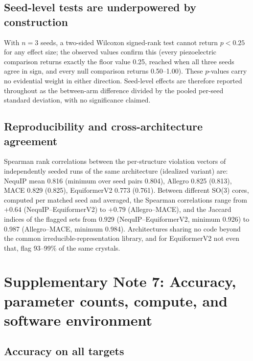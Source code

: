 \subsection*{Seed-level tests are underpowered by construction}

With $n = 3$ seeds, a two-sided Wilcoxon signed-rank test cannot return $p < 0.25$ for any effect size; the observed values confirm this (every piezoelectric comparison returns exactly the floor value 0.25, reached when all three seeds agree in sign, and every null comparison returns 0.50--1.00). These $p$-values carry no evidential weight in either direction. Seed-level effects are therefore reported throughout as the between-arm difference divided by the pooled per-seed standard deviation, with no significance claimed.

\subsection*{Reproducibility and cross-architecture agreement}

Spearman rank correlations between the per-structure violation vectors of independently seeded runs of the same architecture (idealized variant) are: NequIP mean 0.816 (minimum over seed pairs 0.804), Allegro 0.825 (0.813), MACE 0.829 (0.825), EquiformerV2 0.773 (0.761). Between different SO(3) cores, computed per matched seed and averaged, the Spearman correlations range from $+0.64$ (NequIP--EquiformerV2) to $+0.79$ (Allegro--MACE), and the Jaccard indices of the flagged sets from 0.929 (NequIP--EquiformerV2, minimum 0.926) to 0.987 (Allegro--MACE, minimum 0.984). Architectures sharing no code beyond the common irreducible-representation library, and for EquiformerV2 not even that, flag 93--99\% of the same crystals.

\section*{Supplementary Note 7: Accuracy, parameter counts, compute, and software environment}

\subsection*{Accuracy on all targets}

